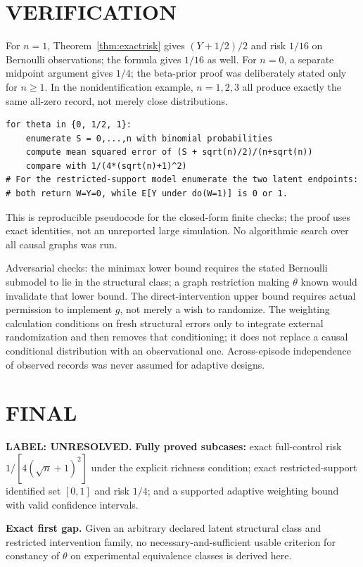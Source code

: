 \documentclass[11pt,a4paper]{article}
\theoremstyle{remark}\newtheorem{remark}[theorem]{Remark}
\begin{document}
\section{VERIFICATION}
For $n=1$, Theorem~\ref{thm:exactrisk} gives $(Y+1/2)/2$ and risk $1/16$ on Bernoulli observations; the formula gives $1/16$ as well. For $n=0$, a separate midpoint argument gives $1/4$; the beta-prior proof was deliberately stated only for $n\ge1$. In the nonidentification example, $n=1,2,3$ all produce exactly the same all-zero record, not merely close distributions.

\begin{lstlisting}
for theta in {0, 1/2, 1}:
    enumerate S = 0,...,n with binomial probabilities
    compute mean squared error of (S + sqrt(n)/2)/(n+sqrt(n))
    compare with 1/(4*(sqrt(n)+1)^2)
# For the restricted-support model enumerate the two latent endpoints:
# both return W=Y=0, while E[Y under do(W=1)] is 0 or 1.
\end{lstlisting}
This is reproducible pseudocode for the closed-form finite checks; the proof uses exact identities, not an unreported large simulation. No algorithmic search over all causal graphs was run.

Adversarial checks: the minimax lower bound requires the stated Bernoulli submodel to lie in the structural class; a graph restriction making $\theta$ known would invalidate that lower bound. The direct-intervention upper bound requires actual permission to implement $g$, not merely a wish to randomize. The weighting calculation conditions on fresh structural errors only to integrate external randomization and then removes that conditioning; it does not replace a causal conditional distribution with an observational one. Across-episode independence of observed records was never assumed for adaptive designs.

\section{FINAL}
\textbf{LABEL: UNRESOLVED.}
\textbf{Fully proved subcases:} exact full-control risk $1/[4(\sqrt n+1)^2]$ under the explicit richness condition; exact restricted-support identified set $[0,1]$ and risk $1/4$; and a supported adaptive weighting bound with valid confidence intervals.

\textbf{Exact first gap.} Given an arbitrary declared latent structural class and restricted intervention family, no necessary-and-sufficient usable criterion for constancy of $\theta$ on experimental equivalence classes is derived here.
\end{document}

